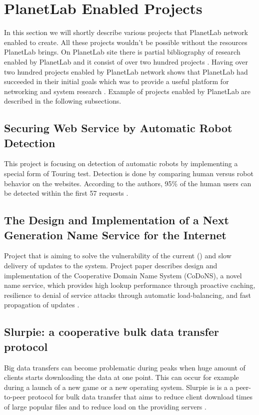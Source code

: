 \section{PlanetLab Enabled Projects}
In this section we will shortly describe various projects that PlanetLab network enabled to create. All these projects wouldn't be possible without the resources PlanetLab brings. On PlanetLab site there is partial bibliography of research enabled by PlanetLab and it consist of over two hundred projects \cite{planetlabmain}. Having over two hundred projects enabled by PlanetLab network shows that PlanetLab had succeeded in their initial goals which was to provide a useful platform for networking and system research \cite{Roscoe_PDN-02-002}. Example of projects enabled by PlanetLab are described in the following subsections.
\subsection{Securing Web Service by Automatic Robot Detection}
This project is focusing on detection of automatic robots by implementing a special form of Touring test. Detection is done by comparing human versus robot behavior on the websites. According to the authors, 95\% of the human users can be detected within the first 57 requests \cite{Park:2006:SWS:1267359.1267382}.
\subsection{The Design and Implementation of a Next Generation Name Service for the Internet}
Project that is aiming to solve the vulnerability of the current  () and slow delivery of updates to the system. Project paper describes design and implementation of the Cooperative Domain Name System (CoDoNS), a novel name service, which provides high lookup performance through proactive caching, resilience to denial of service attacks through automatic load-balancing, and fast propagation of updates \cite{Ramasubramanian:2004:DIN:1030194.1015504}.
\subsection{Slurpie: a cooperative bulk data transfer protocol}
Big data transfers can become problematic during peaks when huge amount of clients starts downloading the data at one point. This can occur for example during a launch of a new game or a new operating system. Slurpie is is a  a peer-to-peer protocol for bulk data transfer that aims to reduce client download times of large popular files and to reduce load on the providing servers \cite{1356981}. 
